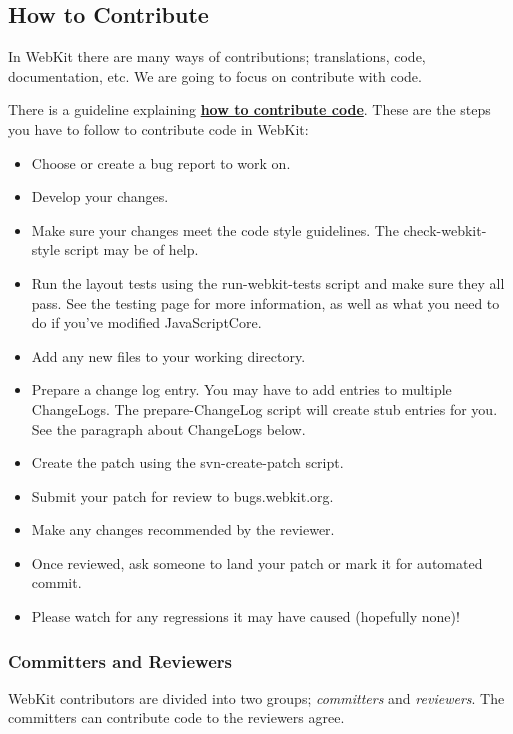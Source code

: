 \subsection{How to Contribute}

\par In WebKit there are many ways of contributions; translations, code, documentation, etc. We are going to focus on contribute with code.
\par There is a guideline explaining  \textbf {\href{http://www.webkit.org/coding/contributing.html}{how to contribute code}}. These are the steps you have to follow to contribute code in WebKit:
\begin{itemize}
	\item Choose or create a bug report to work on.
	\item Develop your changes.
	\item Make sure your changes meet the code style guidelines. The check-webkit-style script may be of help.
	\item Run the layout tests using the run-webkit-tests script and make sure they all pass. See the testing page for more information, as well as what you need to do if you've modified JavaScriptCore.
	\item Add any new files to your working directory.
	\item Prepare a change log entry. You may have to add entries to multiple ChangeLogs. The prepare-ChangeLog script will create stub entries for you. See the paragraph about ChangeLogs below.
	\item Create the patch using the svn-create-patch script.
	\item Submit your patch for review to bugs.webkit.org.
	\item Make any changes recommended by the reviewer.
	\item Once reviewed, ask someone to land your patch or mark it for automated commit.
	\item Please watch for any regressions it may have caused (hopefully none)!
\end{itemize}

\subsubsection{Committers and Reviewers}

\par WebKit contributors are divided into two groups; \textit{committers} and \textit{reviewers}. The committers can contribute code to the reviewers agree.

